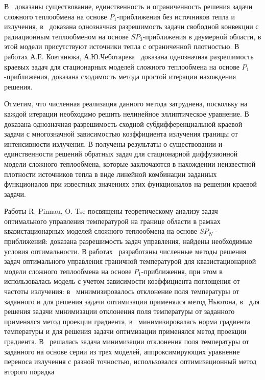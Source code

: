В~\cite{Pinnau2007} доказаны существование, единственность и ограниченность решения задачи сложного
теплообмена на основе $P_1$-приближения без источников
тепла и излучения, в~\cite{Pinnau2013} доказана однозначная разрешимость задачи свободной
конвекции с радиационным теплообменом на основе $SP_3$-приближения в двумерной области,
в этой модели присутствуют источники тепла с ограниченной плотностью.
В работах А.Е. Ковтанюка, А.Ю.Чеботарева~\cite{Kovtanyuk2014K, Kovtanyuk2016, vtanyuk2015}
доказана однозначная разрешимость краевых задач для стационарных моделей сложного теплообмена
на основе $P_1$-приближения, доказана сходимость метода простой итерации нахождения решения.


Отметим, что численная реализация данного метода затруднена,
поскольку на каждой итерации необходимо решить нелинейное эллиптическое уравнение.
В \cite{Chebotarev2016Odnaznachnaya} доказана однозначная разрешимость
сходной субдифференциальной краевой задачи с многозначной
зависимостью коэффициента излучения границы от интенсивности излучения.
В \cite{astrakhantseva2017analysis, chebotarev2018inverse}
получены результаты о существовании и единственности решений обратных
задач для стационарной диффузионной
модели сложного теплообмена, которые заключаются в нахождении
неизвестной плотности источников тепла в виде линейной
комбинации заданных функционалов при известных значениях этих
функционалов на решении краевой задачи.

Работы R. Pinnau, O. Tse \cite{Pinnau2007, Pinnau2013}
посвящены теоретическому анализу задач оптимального управления температурой на границе
области в рамках квазистационарных моделей сложного теплообмена на основе
$SP_N$ - приближений: доказана разрешимость задач управления,
найдены необходимые условия оптимальности.
В работах~\cite{
    clever2012optimal, clever2014model,lang2005adaptive,
    frank2011adaptive,
    Pinnau2007b, Pinnau2013
}
 разработаны численные методы решения задач
оптимального управления граничной температурой
для квазистационарной модели сложного теплообмена на основе $P_1$-приближения,
при этом в \cite{clever2012optimal, clever2014model,lang2005adaptive}
использовалась модель с учетом зависимости коэффициента
поглощения от частоты излучения:
в~\cite{frank2011adaptive, Pinnau2007b} минимизировалось отклонение
поля температуры от заданного и для решения
задачи оптимизации применялся метод Ньютона,
в~\cite{lang2005adaptive} для решения задачи минимизации
отклонения поля температуры от заданного
применялся метод проекции градиента, в~\cite{clever2012optimal, Pinnau2013}
минимизировалась норма градиента температуры и для решения задачи
оптимизации применялся метод проекции градиента.
В~\cite{clever2014model} решалась задача минимизации отклонения
поля температуры от заданного на основе серии из
трех моделей, аппроксимирующих уравнение переноса излучения с разной точностью,
использовался оптимизационный метод второго порядка


